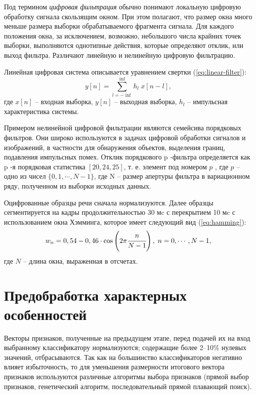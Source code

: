 Под термином \textit{цифровая фильтрация} обычно понимают локальную цифровую обработку сигнала скользящим окном. При этом полагают, что размер окна много меньше размера выборки обрабатываемого фрагмента сигнала. Для каждого положения окна, за исключением, возможно, небольшого числа крайних точек выборки, выполняются однотипные действия, которые определяют отклик, или выход фильтра. Различают линейную и нелинейную цифровую фильтрацию. \cite{methodcos}

\noindent Линейная цифровая система описывается уравнением свертки (\ref{eq:linear-filter}):
\begin{equation}\label{eq:linear-filter}
    y[n] = \sum_{l = -\inf}^{\inf} h_l\;x[n - l],
\end{equation}
где $x[n]$ -- входная выборка, $y[n]$ -- выходная выборка, $h_l$ – импульсная
характеристика системы.

Примером нелинейной цифровой фильтрации являются семейсива порядковых фильтров. Они широко используются в задачах цифровой обработки сигналов и изображений, в частности для обнаружения объектов, выделения границ, подавления импульсных помех. Отклик порядкового p -фильтра определяется как p -я порядковая статистика $[20, 24, 25]$, т. е. элемент под номером $p$ , где $p$ -- одно из чисел $\{0, 1, \cdots, N - 1\}$, где N – размер апертуры фильтра в вариационном ряду, полученном из выборки исходных данных.

Оцифрованные образцы речи сначала нормализуются. Далее образцы сегментируется на кадры продолжительностью 30 мc с перекрытием 10 мc с использованием окна Хэмминга, которое имеет следующий вид (\ref{eq:hamming}):
\begin{equation}\label{eq:hamming}
    w_n = 0,54 - 0,46\cdot\cos\left( 2\pi \cfrac{n}{N - 1}\right),\;n = 0,\cdots,N-1,
\end{equation}
где $N$ -- длина окна, выраженная в отсчетах.
\section{Предобработка характерных особенностей}
Векторы признаков, полученные на предыдущем этапе, перед подачей их на вход выбранному классификатору нормализуются; содержащие более 2–10\% нулевых значений, отбрасываются. \cite{speechrecog} Так как на большинство классификаторов негативно влияет избыточность, то для уменьшения размерности итогового вектора признаков используются различные алгоритмы выбора признаков (прямой выбор признаков, генетический алгоритм, последовательный прямой плавающий поиск).

